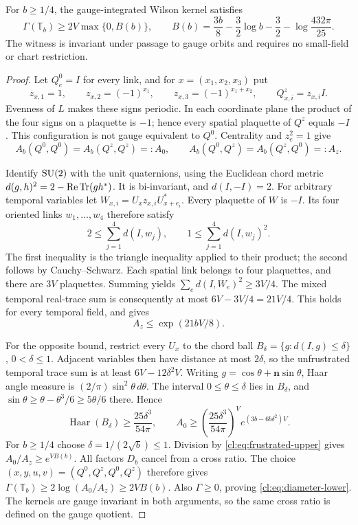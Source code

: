 \begin{theorem}\label{cl:thm:frustrated}
For $b\ge1/4$, the gauge-integrated Wilson kernel satisfies
\begin{equation}\label{cl:eq:diameter-lower}
\Gamma(\mathbb T_b)\ge2V\max\{0,B(b)\},\qquad
B(b)=\frac{3b}{8}-\frac32\log b-\frac32-\log\frac{432\pi}{25}.
\end{equation}
The witness is invariant under passage to gauge orbits and requires no
small-field or chart restriction.
\end{theorem}
\begin{proof}
Let $Q^0_e=I$ for every link, and for $x=(x_1,x_2,x_3)$ put
\[
z_{x,1}=1,\qquad z_{x,2}=(-1)^{x_1},\qquad
z_{x,3}=(-1)^{x_1+x_2},\qquad Q^z_{x,i}=z_{x,i}I.
\]
Evenness of $L$ makes these signs periodic. In each coordinate plane
the product of the four signs on a plaquette is $-1$; hence every
spatial plaquette of $Q^z$ equals $-I$. This configuration is not gauge
equivalent to $Q^0$. Centrality and $z_e^2=1$ give
\[
A_b(Q^0,Q^0)=A_b(Q^z,Q^z)=:A_0,\qquad
A_b(Q^0,Q^z)=A_b(Q^z,Q^0)=:A_z.
\]

Identify $\mathrm{SU}(2)$ with the unit quaternions, using the Euclidean chord
metric $d(g,h)^2=2-\operatorname{Re}\operatorname{Tr}(gh^*)$. It is bi-invariant, and $d(I,-I)=2$.
For arbitrary temporal variables let $W_{x,i}=U_xz_{x,i}U_{x+e_i}^*$.
Every plaquette of $W$ is $-I$. Its four oriented links $w_1,\ldots,w_4$
therefore satisfy
\[
2\le\sum_{j=1}^4d(I,w_j),\qquad
1\le\sum_{j=1}^4d(I,w_j)^2.
\]
The first inequality is the triangle inequality applied to their
product; the second follows by Cauchy--Schwarz. Each spatial link
belongs to four plaquettes, and there are $3V$ plaquettes. Summing yields
$\sum_ed(I,W_e)^2\ge3V/4$. The mixed temporal real-trace sum is consequently
at most $6V-3V/4=21V/4$. This holds for every temporal field, and gives
\begin{equation}\label{cl:eq:frustrated-upper}
A_z\le\exp(21bV/8).
\end{equation}

For the opposite bound, restrict every $U_x$ to the chord ball
$B_\delta=\{g:d(I,g)\le\delta\}$, $0<\delta\le1$.
Adjacent variables then have distance at most $2\delta$, so the
unfrustrated temporal trace sum is at least $6V-12\delta^2V$.
Writing $g=\cos\theta+\mathbf n\sin\theta$, Haar angle measure is
$(2/\pi)\sin^2\theta\,d\theta$. The interval $0\le\theta\le\delta$
lies in $B_\delta$, and $\sin\theta\ge\theta-\theta^3/6\ge5\theta/6$
there. Hence
\[
\operatorname{Haar}(B_\delta)\ge\frac{25\delta^3}{54\pi},\qquad
A_0\ge\left(\frac{25\delta^3}{54\pi}\right)^V
                  e^{(3b-6b\delta^2)V}.
\]
For $b\ge1/4$ choose $\delta=1/(2\sqrt b)\le1$. Division by
\eqref{cl:eq:frustrated-upper} gives $A_0/A_z\ge e^{VB(b)}$.
All factors $D_b$ cancel from a cross ratio. The choice
$(x,y,u,v)=(Q^0,Q^z,Q^0,Q^z)$ therefore gives
$\Gamma(\mathbb T_b)\ge2\log(A_0/A_z)\ge2VB(b)$.
Also $\Gamma\ge0$, proving \eqref{cl:eq:diameter-lower}.
The kernels are gauge invariant in both arguments, so the same
cross ratio is defined on the gauge quotient.
\end{proof}

